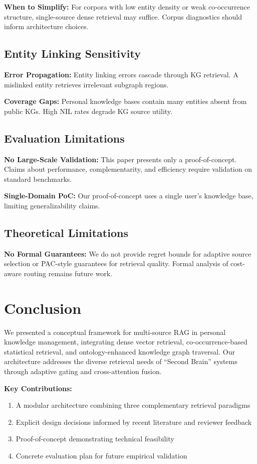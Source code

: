 \documentclass[11pt,a4paper]{article}
\begin{document}
\textbf{When to Simplify:} For corpora with low entity density or weak co-occurrence structure, single-source dense retrieval may suffice. Corpus diagnostics should inform architecture choices.

\subsection{Entity Linking Sensitivity}

\textbf{Error Propagation:} Entity linking errors cascade through KG retrieval. A mislinked entity retrieves irrelevant subgraph regions.

\textbf{Coverage Gaps:} Personal knowledge bases contain many entities absent from public KGs. High NIL rates degrade KG source utility.

\subsection{Evaluation Limitations}

\textbf{No Large-Scale Validation:} This paper presents only a proof-of-concept. Claims about performance, complementarity, and efficiency require validation on standard benchmarks.

\textbf{Single-Domain PoC:} Our proof-of-concept uses a single user's knowledge base, limiting generalizability claims.

\subsection{Theoretical Limitations}

\textbf{No Formal Guarantees:} We do not provide regret bounds for adaptive source selection or PAC-style guarantees for retrieval quality. Formal analysis of cost-aware routing remains future work.

\section{Conclusion}
\label{sec:conclusion}

We presented a conceptual framework for multi-source RAG in personal knowledge management, integrating dense vector retrieval, co-occurrence-based statistical retrieval, and ontology-enhanced knowledge graph traversal. Our architecture addresses the diverse retrieval needs of ``Second Brain'' systems through adaptive gating and cross-attention fusion.

\textbf{Key Contributions:}
\begin{enumerate}
    \item A modular architecture combining three complementary retrieval paradigms
    \item Explicit design decisions informed by recent literature and reviewer feedback
    \item Proof-of-concept demonstrating technical feasibility
    \item Concrete evaluation plan for future empirical validation
\end{enumerate}
\end{document}
